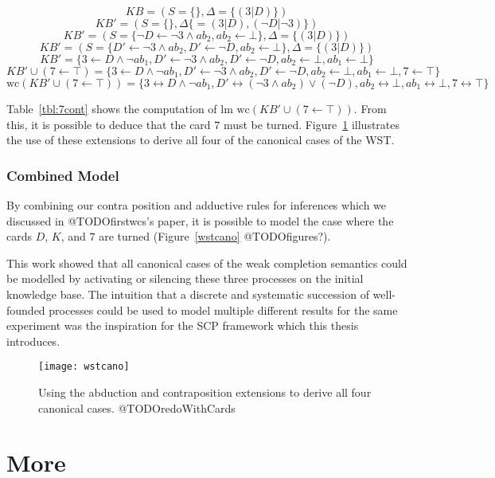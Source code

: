 \[
KB = (S=\{\},\Delta=\{(3|D)\})
\]
\[
KB' = (S=\{\},\Delta\{=(3|D),(\lnot D|\lnot 3)\})
\]
\[
KB' = (S=\{\lnot D \leftarrow \lnot 3 \land ab_2, ab_2\leftarrow \bot\}, \Delta=\{(3|D)\})
\]
\[
KB' = (S=\{D' \leftarrow \lnot 3 \land ab_2, D' \leftarrow \lnot D, ab_2\leftarrow \bot\}, \Delta=\{(3|D)\})
\]
\[
KB' = \{3 \leftarrow D \land \lnot ab_1, D' \leftarrow \lnot 3 \land ab_2, D' \leftarrow \lnot D,  ab_2\leftarrow \bot, ab_1\leftarrow \bot\}
\]
\[
KB'\cup (7\leftarrow\top) = \{3 \leftarrow D \land \lnot ab_1, D' \leftarrow \lnot 3 \land ab_2, D' \leftarrow \lnot D,  ab_2\leftarrow \bot, ab_1\leftarrow \bot, 7\leftarrow\top \}
\]
\begin{equation} \label{eqn:wst_contra}
\textrm{wc} (KB'\cup (7\leftarrow\top)) = \{3 \leftrightarrow D \land \lnot ab_1, D' \leftrightarrow (\lnot 3 \land ab_2) \lor (\lnot D),  ab_2\leftrightarrow \bot, ab_1\leftrightarrow \bot, 7\leftrightarrow\top \}
\end{equation}

Table~\ref{tbl:7cont} shows the computation of $\textrm{lm wc} (KB'\cup (7\leftarrow\top))$. From this, it is possible to deduce that the card $7$ must be turned. Figure~\ref{fig:wstcano} illustrates the use of these extensions to derive all four of the canonical cases of the WST.

\subsubsection*{Combined Model}
By combining our contra position and adductive rules for inferences which we discussed in @TODOfirstwcs's paper, it is possible to model the case where the cards $D$, $K$, and $7$ are turned (Figure~\ref{wstcano} @TODOfigures?).

This work showed that all canonical cases of the weak completion semantics could be modelled by activating or silencing these three processes on the initial knowledge base. The intuition that a discrete and systematic succession of well-founded processes could be used to model multiple different results for the same experiment was the inspiration for the SCP framework which this thesis introduces.


\begin{figure}
\centering \texttt{[image: wstcano]}
\caption{Using the abduction and contraposition extensions to derive all four canonical cases. @TODOredoWithCards}
\label{fig:wstcano}
\end{figure}








\section{More}